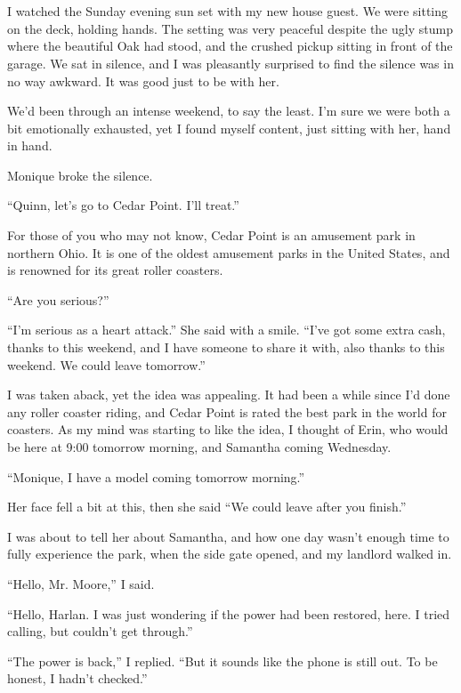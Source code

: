 \chapter{~}
I watched the Sunday evening sun set with my new house guest. We were sitting on the deck,
holding hands. The setting was very peaceful despite the ugly stump where the beautiful Oak had
stood, and the crushed pickup sitting in front of the garage. We sat in silence, and I was
pleasantly surprised to find the silence was in no way awkward. It was good just to be with her.

We'd been through an intense weekend, to say the least. I'm sure we were both a bit
emotionally exhausted, yet I found myself content, just sitting with her, hand in hand.

Monique broke the silence.

``Quinn, let's go to Cedar Point. I'll treat.''

For those of you who may not know, Cedar Point is an amusement park in northern Ohio. It is
one of the oldest amusement parks in the United States, and is renowned for its great roller
coasters.

``Are you serious?''

``I'm serious as a heart attack.'' She said with a smile. ``I've got some extra cash, thanks to
this weekend, and I have someone to share it with, also thanks to this weekend. We could leave
tomorrow.''

I was taken aback, yet the idea was appealing. It had been a while since I'd done any roller
coaster riding, and Cedar Point is rated the best park in the world for coasters. As my mind was
starting to like the idea, I thought of Erin, who would be here at 9:00 tomorrow morning, and
Samantha coming Wednesday.

``Monique, I have a model coming tomorrow morning.''

Her face fell a bit at this, then she said ``We could leave after you finish.''

I was about to tell her about Samantha, and how one day wasn't enough time to fully
experience the park, when the side gate opened, and my landlord walked in.

``Hello, Mr. Moore,'' I said.

``Hello, Harlan. I was just wondering if the power had been restored, here. I tried calling,
but couldn't get through.''

``The power is back,'' I replied. ``But it sounds like the phone is still out. To be honest, I
hadn't checked.''

